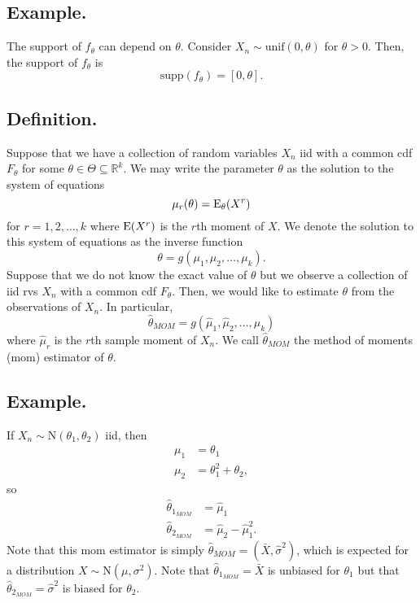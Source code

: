 \documentclass[titlepage]{article}
\begin{document}
\subsection{Example.} The support of $f_{\theta}$ can depend on $\theta$. Consider $X_{n} \sim \text{unif}(0, \theta)$ for $\theta > 0$. Then, the support of $f_{\theta}$ is
$$\text{supp}(f_{\theta}) = [0, \theta].$$

\subsection{Definition.} Suppose that we have a collection of random variables $X_{n}$ iid with a common cdf $F_{\theta}$ for some $\theta \in \Theta \subseteq \mathbb{R}^{k}$. We may write the parameter $\theta$ as the solution to the system of equations 
$$\mu_{r}(\theta) = \text{E}_{\theta}(X^{r})$$
for $r = 1, 2, \ldots, k$ where $\text{E}(X^{r})$ is the $r$th moment of $X$. We denote the solution to this system of equations as the inverse function 
$$\theta = g(\mu_{1}, \mu_{2}, \ldots, \mu_{k}).$$
Suppose that we do not know the exact value of $\theta$ but we observe a collection of iid rvs $X_{n}$ with a common cdf $F_{\theta}$. Then, we would like to estimate $\theta$ from the observations of $X_{n}$. In particular, 
$$\hat{\theta}_{MOM} = g(\hat{\mu}_{1}, \hat{\mu}_{2}, \ldots, \hat{\mu}_{k})$$
where $\hat{\mu}_{r}$ is the $r$th sample moment of $X_{n}$. We call $\hat{\theta}_{MOM}$ the method of moments (mom) estimator of $\theta$.

\subsection{Example.} If $X_{n} \sim \text{N}(\theta_{1}, \theta_{2})$ iid, then 
\begin{align*}
    \mu_{1} &= \theta_{1} \\
    \mu_{2} &= \theta_{1}^{2} + \theta_{2},
\end{align*}
so 
\begin{align*}
    \hat{\theta}_{1_{MOM}} &= \hat{\mu}_{1} \\
    \hat{\theta}_{2_{MOM}} &= \hat{\mu}_{2} - \hat{\mu}_{1}^{2}.
\end{align*}
Note that this mom estimator is simply $\hat{\theta}_{MOM} = (\bar{X}, \hat{\sigma}^{2})$, which is expected for a distribution $X \sim \text{N}(\mu, \sigma^{2})$. Note that $\hat{\theta}_{1_{MOM}} = \bar{X}$ is unbiased for $\theta_{1}$ but that $\hat{\theta}_{2_{MOM}} = \hat{\sigma}^{2}$ is biased for $\theta_{2}$.
\end{document}
